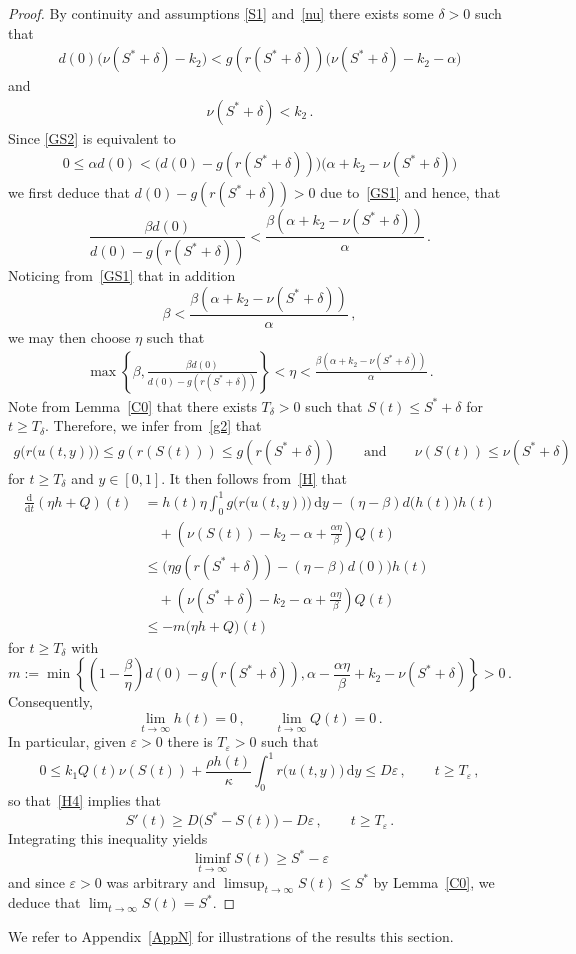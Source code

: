 \documentclass[reqno,11pt]{amsart}
\numberwithin{equation}{section}
\newcommand{\ve}{\varepsilon}
\newcommand{\rd}{\mathrm{d}}
\begin{document}
\begin{proof}
By continuity  and assumptions \eqref{S1} and~\eqref{nu} there exists some $\delta>0$ such that
\begin{align}\label{GS2}
d(0)\big( \nu(S^*+\delta)-k_2\big)<g(r(S^*+\delta))\big(\nu(S^*+\delta)-k_2-\alpha\big)
\end{align}
 and
\begin{align}\label{GS1}
\nu(S^*+\delta)<k_2\,.
\end{align}
Since \eqref{GS2} is equivalent to
\begin{align}\label{GS2b}
0\le \alpha d(0)<\big(d(0)-g(r(S^*+\delta))\big)\big(\alpha+k_2-\nu(S^*+\delta)\big)
\end{align}
we first deduce that $d(0)-g(r(S^*+\delta))>0$ due to~\eqref{GS1} and hence, that
$$
\frac{\beta d(0)}{d(0)-g(r(S^*+\delta))}<\frac{\beta(\alpha+k_2-\nu(S^*+\delta))}{\alpha}\,.
$$
Noticing from~\eqref{GS1} that in addition
$$
\beta<\frac{\beta(\alpha+k_2-\nu(S^*+\delta))}{\alpha}\,,
$$
we may then choose $\eta$ such that
\begin{align}\label{etaGS}
\max\left\{\beta,\frac{\beta d(0)}{d(0)-g(r(S^*+\delta))}\right\}<\eta<\frac{\beta(\alpha+k_2-\nu(S^*+\delta))}{\alpha}\,.
\end{align}
Note from Lemma~\ref{C0} that there exists $T_\delta>0$ such that $S(t)\le S^*+\delta$ for $t\ge T_\delta$. Therefore, we infer from~\eqref{g2} that 
\begin{align*}
g\bigl(r\bigl(u(t,y)\bigr)\bigr)\le g(r(S(t)))\le g(r(S^*+\delta))
\qquad \text{and}\qquad  \nu(S(t))\le \nu(S^*+\delta)
\end{align*}
for $t\ge T_\delta$ and $y\in [0,1]$. It then follows from~\eqref{H} that
\begin{align*}
\frac{\rd}{\rd t}\left(\eta h+Q\right)(t)&=h(t)\eta\int_0^1  g\bigl(r\bigl(u(t,y)\bigr)\bigr)\,\rd y-(\eta-\beta)d\big(h(t)\big)h(t)\\
&\quad +\left(\nu(S(t))-k_2-\alpha+\frac{\alpha\eta}{\beta}\right)Q(t)\\
&\le \Big(\eta g(r(S^*+\delta))-(\eta-\beta)d(0)\Big)h(t)\\
&\quad +\left(\nu(S^*+\delta)-k_2-\alpha+\frac{\alpha\eta}{\beta}\right)Q(t)\\
&\le -m \big(\eta h+Q\big)(t)
\end{align*}
for $t\ge T_\delta$ with 
$$
m:=\min\left\{ (1-\frac{\beta}{\eta})d(0)-g(r(S^*+\delta)), \alpha-\frac{\alpha\eta}{\beta}+k_2-\nu(S^*+\delta)\right\}>0\,.
$$
Consequently,
$$
\lim_{t\to\infty} h(t)=0\,,\qquad \lim_{t\to\infty} Q(t)=0\,.
$$
In particular, given $\ve>0$ there is $T_\ve>0$ such that
$$
0\le k_1Q(t)\nu(S(t))+\frac{\rho h(t)}{\kappa} \int_0^1  r\bigl(
u(t,y)\bigr)\,\rd y\le D\ve\,,\qquad t\ge T_\ve\,,
$$ 
so that~\eqref{H4} implies that
$$
S'(t)\ge D\big(S^*-S(t)\big)- D\ve\,,\qquad t\ge T_\ve\,.
$$
Integrating this inequality yields
$$
\liminf_{t\to\infty} S(t)\ge S^*-\ve
$$
and since $\ve>0$ was arbitrary and $\limsup_{t\to\infty} S(t)\le S^*$ by Lemma~\ref{C0}, we deduce that $\lim_{t\to\infty} S(t)= S^*$.
\end{proof}
We refer to Appendix~\ref{AppN} for illustrations of the results this section.
\end{document}
